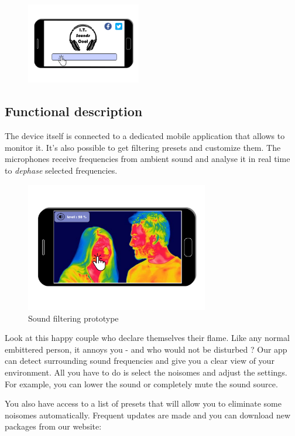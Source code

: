 \documentclass[12pt, a4paper]{article}
\begin{document}
    \begin{figure}[h]
        \centering
        \includegraphics[width=5cm]{pictures/AppSoundsCoolMenu.png}
    \end{figure}

    \subsection{Functional description}

    The device itself is connected to a dedicated mobile application that allows to monitor it. It's also possible to get filtering presets and customize them. The microphones receive frequencies from ambient sound and analyse it in real time to \emph{dephase} selected frequencies.

    \begin{figure}[h]
        \centering
        \includegraphics[width=8cm]{pictures/AppSoundsCool.png}
        \caption{Sound filtering prototype}
    \end{figure}

    Look at this happy couple who declare themselves their flame. Like any normal embittered person, it annoys you - and who would not be disturbed ? Our app can detect surrounding sound frequencies and give you a clear view of your environment. All you have to do is select the noisomes and adjust the settings. For example, you can lower the sound or completely mute the sound source.

    You also have access to a list of presets that will allow you to eliminate some noisomes automatically. Frequent updates are made and you can download new packages from our website:
    
\end{document}
